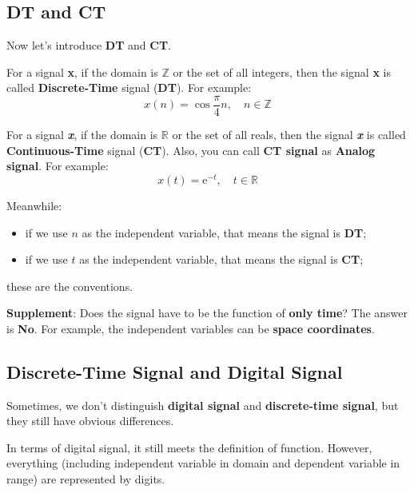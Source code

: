     \newpage
    \subsection{DT and CT}
        Now let's introduce \textbf{DT} and \textbf{CT}.

        For a signal \textbf{x}, if the domain is $\mathbb{Z}$ or the set of all integers, 
        then the signal \textbf{x} is called \textbf{Discrete-Time} signal (\textbf{DT}).
        For example:
            \begin{equation}
                x(n) = \cos \frac{\pi}{4} n,\quad n \in \mathbb{Z}
            \end{equation}
        
        For a signal \textbf{\emph{x}}, if the domain is $\mathbb{R}$ or the set of all reals, 
        then the signal \textbf{\emph{x}} is called \textbf{Continuous-Time} signal (\textbf{CT}).
        Also, you can call \textbf{CT signal} as \textbf{Analog signal}.
        For example:
            \begin{equation}
                x(t) = \mathrm{e}^{-t},\quad t \in \mathbb{R}
            \end{equation}

        Meanwhile:
            \begin{itemize}
                \item if we use $n$ as the independent variable, that means the signal is \textbf{DT};
                \item if we use $t$ as the independent variable, that means the signal is \textbf{CT};
            \end{itemize}
        these are the conventions.

        \textbf{Supplement}: Does the signal have to be the function of \textbf{only time}? The answer is \textbf{No}.
        For example, the independent variables can be \textbf{space coordinates}.
    
    \subsection{Discrete-Time Signal and Digital Signal}
        Sometimes, we don't distinguish \textbf{digital signal} and \textbf{discrete-time signal}, 
        but they still have obvious differences.

        In terms of digital signal, it still meets the definition of function. 
        However, everything (including independent variable in domain and dependent variable in range) are represented by digits.

